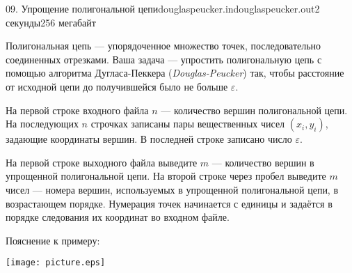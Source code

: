 \begin{problem}{09. Упрощение полигональной цепи}{douglaspeucker.in}{douglaspeucker.out}{2 секунды}{256 мегабайт}

Полигональная цепь — упорядоченное множество точек, последовательно соединенных отрезками.
Ваша задача — упростить полигональную цепь с помощью алгоритма Дугласа-Пеккера (\emph{Douglas-Peucker}) так,
чтобы расстояние от исходной цепи до получившейся было не больше $\varepsilon$.

\InputFile

На первой строке входного файла $n$ — количество вершин полигональной цепи.
На последующих $n$ строчках записаны пары вещественных чисел $(x_i, y_i)$, задающие координаты вершин.
В последней строке записано число $\varepsilon$.

\OutputFile

На первой строке выходного файла выведите $m$ — количество вершин в упрощенной полигональной цепи.
На второй строке через пробел выведите $m$ чисел — номера вершин, используемых в упрощенной полигональной цепи, в возрастающем порядке.
Нумерация точек начинается с единицы и задаётся в порядке следования их координат во входном файле.

\Examples

\begin{example}%
%
\end{example}
\Note
Пояснение к примеру:
	\begin{center}
		\texttt{[image: picture.eps]}
	\end{center}
\end{problem}